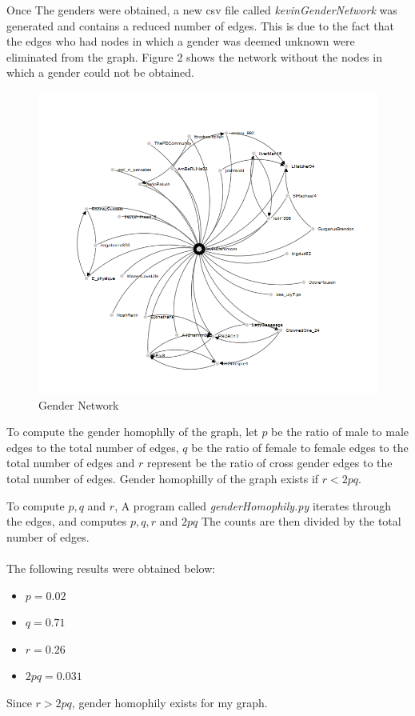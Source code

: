 \documentclass[12pt,letterpaper]{article}
\begin{document}
Once The genders were obtained, a new csv file called {\it kevinGenderNetwork} was generated and contains a reduced number of edges. This is due to the fact that the edges who had nodes in which a gender was deemed unknown were eliminated from the graph. Figure 2 shows the network without the nodes in which a gender could not be obtained. 
\newpage 
\begin{figure}[ht!]
\centering 
\includegraphics[scale=0.55]{genderGraph}
\caption{Gender Network}
\label{overflow}
\end{figure}

To compute the gender homophlly of the graph, let $p$ be the ratio of male to male edges to the total number of edges, $q$ be the ratio of female to female edges to the total number of edges and $r$ represent be the ratio of cross gender edges to the total number of edges. Gender homophilly of the graph exists if $r < 2pq$\cite{michaelnelson}. 

To compute $p,q$ and $r$, A program called {\it genderHomophily.py} iterates through the edges, and computes $p,q,r$ and $2pq$ The counts are then divided by the total number of edges. \\ \\ The following results were obtained below: 
\begin{itemize}
    \item $p = 0.02$ 
    \item $q = 0.71$
    \item $r = 0.26$
    \item $2pq = 0.031$
\end{itemize}
\newpage 
Since $r > 2pq$, gender homophily exists for my graph. 
\printbibliography
\end{document}
